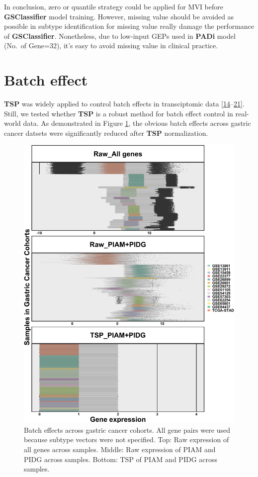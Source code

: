 \documentclass[
  12pt,
]{book}
\begin{document}
In conclusion, zero or quantile strategy could be applied for MVI before \textbf{GSClassifier} model training. However, missing value should be avoided as possible in subtype identification for missing value really damage the performance of \textbf{GSClassifier}. Nonetheless, due to low-input GEPs used in \textbf{PADi} model (No.~of Gene=32), it's easy to avoid missing value in clinical practice.

\hypertarget{batch-effect}{%
\section{Batch effect}\label{batch-effect}}

\textbf{TSP} was widely applied to control batch effects in transciptomic data {[}\protect\hyperlink{ref-RN369}{14}--\protect\hyperlink{ref-RN365}{21}{]}. Still, we tested whether \textbf{TSP} is a robust method for batch effect control in real-world data. As demonstrated in Figure \ref{fig:be01}, the obvious batch effects across gastric cancer datsets were significantly reduced after \textbf{TSP} normalization.

\begin{figure}

{\centering \includegraphics[width=0.9\linewidth]{./fig/bactch-effect-01} 

}

\caption{Batch effects across gastric cancer cohorts. All gene pairs were used because subtype vectors were not specified. Top: Raw expression of all genes across samples. Middle: Raw expression of PIAM and PIDG across samples. Bottom: TSP of PIAM and PIDG across samples.}\label{fig:be01}
\end{figure}
\end{document}
